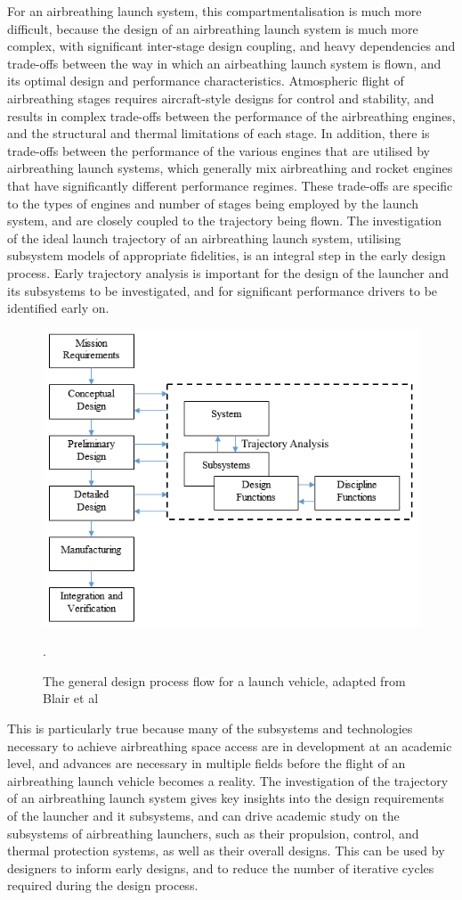     For an airbreathing launch system, this compartmentalisation is much more difficult, because the design of an airbreathing launch system is much more complex, with significant inter-stage design coupling, and heavy dependencies and trade-offs between the way in which an airbeathing launch system is flown, and its optimal design and performance characteristics. Atmospheric flight of airbreathing stages requires aircraft-style designs for control and stability, and results in complex trade-offs between the performance of the airbreathing engines, and the structural and thermal limitations of each stage. In addition, there is trade-offs between the performance of the various engines that are utilised by airbreathing launch systems, which generally mix airbreathing and rocket engines that have significantly different performance regimes.
    These trade-offs are specific to the types of engines and number of stages being employed by the launch system, and are closely coupled to the trajectory being flown. The investigation of the ideal launch trajectory of an airbreathing launch system, utilising subsystem models of appropriate fidelities, is an integral step in the early design process. Early trajectory analysis is important for the design of the launcher and its subsystems to be investigated, and for significant performance drivers to be identified early on. 
    \begin{figure}[ht]
    	\centering
    	\includegraphics[width=0.6\linewidth]{figures/2_literature-review/DesignFlow}
    	\caption{The general design process flow for a launch vehicle, adapted from Blair et al\cite{Blair2001}}.
    	\label{fig:DesignFlow}
    \end{figure}
  This is particularly true because many of the subsystems and technologies necessary to achieve airbreathing space access are in development at an academic level, and advances are necessary in multiple fields before the flight of an airbreathing launch vehicle becomes a reality. The investigation of the trajectory of an airbreathing launch system gives key insights into the design requirements of the launcher and it subsystems, and can drive academic study on the subsystems of airbreathing launchers, such as their propulsion, control, and thermal protection systems, as well as their overall designs. This can be used by designers to inform early designs, and to reduce the number of iterative cycles required during the design process. 
    
  